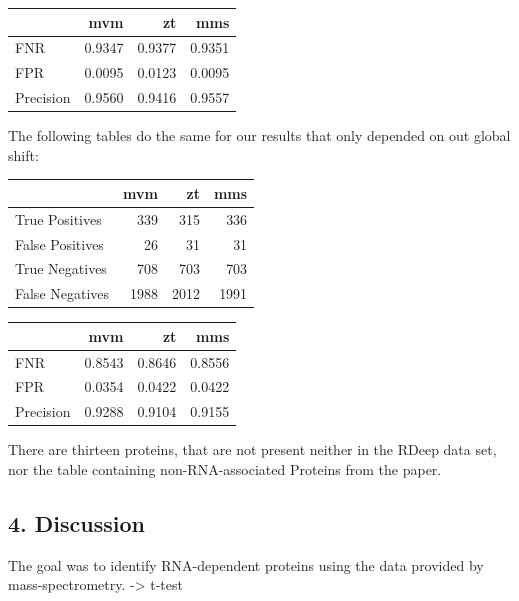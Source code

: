 \documentclass[
  12pt,
]{article}
\begin{document}
\begin{table}
\centering
\begin{tabular}{l|r|r|r}
\hline
  & mvm & zt & mms\\
\hline
FNR & 0.9347 & 0.9377 & 0.9351\\
\hline
FPR & 0.0095 & 0.0123 & 0.0095\\
\hline
Precision & 0.9560 & 0.9416 & 0.9557\\
\hline
\end{tabular}
\end{table}

The following tables do the same for our results that only depended on
out global shift:

\begin{table}
\centering
\begin{tabular}{l|r|r|r}
\hline
  & mvm & zt & mms\\
\hline
True Positives & 339 & 315 & 336\\
\hline
False Positives & 26 & 31 & 31\\
\hline
True Negatives & 708 & 703 & 703\\
\hline
False Negatives & 1988 & 2012 & 1991\\
\hline
\end{tabular}
\end{table}

\begin{table}
\centering
\begin{tabular}{l|r|r|r}
\hline
  & mvm & zt & mms\\
\hline
FNR & 0.8543 & 0.8646 & 0.8556\\
\hline
FPR & 0.0354 & 0.0422 & 0.0422\\
\hline
Precision & 0.9288 & 0.9104 & 0.9155\\
\hline
\end{tabular}
\end{table}

There are thirteen proteins, that are not present neither in the RDeep
data set, nor the table containing non-RNA-associated Proteins from the
paper.

\hypertarget{discussion}{%
\subsection{4. Discussion}\label{discussion}}

The goal was to identify RNA-dependent proteins using the data provided
by mass-spectrometry. -\textgreater{} t-test
\end{document}
